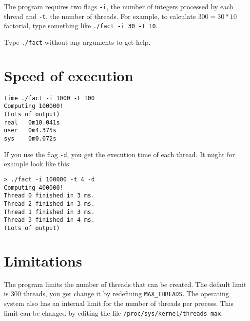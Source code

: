 \documentclass[11pt,twoside]{article}
\begin{document}
The program requires two flags \verb!-i!, the number of integers processed by each thread and \verb!-t!, the number of threads. For example, to calculate
$300 = 30 * 10$ factorial, type something like \verb!./fact -i 30 -t 10!.

\begin{mdframed}[style=MyFrame]
Type \verb!./fact! without any arguments to get help.
\end{mdframed}

\section{Speed of execution}
\begin{verbatim}
time ./fact -i 1000 -t 100
Computing 100000!
(Lots of output)
real   0m10.041s
user   0m4.375s
sys    0m0.072s
\end{verbatim}

If you use the flag \verb!-d!, you get the execution time of each thread. It might for example look like this:

\begin{verbatim}
> ./fact -i 100000 -t 4 -d
Computing 400000!
Thread 0 finished in 3 ms.
Thread 2 finished in 3 ms.
Thread 1 finished in 3 ms.
Thread 3 finished in 4 ms.
(Lots of output)
\end{verbatim}

\section{Limitations}
The program limits the number of threads that can be created. The default limit is 300 threads, you get change it by redefining \verb!MAX_THREADS!. The operating system also has an internal limit for the number of threads per process. This limit can be changed by editing the file \verb!/proc/sys/kernel/threads-max!.
\end{document}
